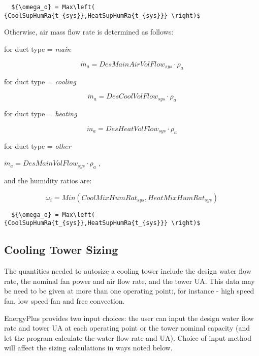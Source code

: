 \begin{lstlisting}
  ${\omega_o} = Max\left( {CoolSupHumRa{t_{sys}},HeatSupHumRa{t_{sys}}} \right)$ 
\end{lstlisting}

Otherwise, air mass flow rate is determined as follows:

for duct type = \emph{main}

\begin{equation}
{\dot m_a} = DesMainAirVolFlo{w_{sys}} \cdot {\rho_a}
\end{equation}

for duct type = \emph{cooling}

\begin{equation}
{\dot m_a} = DesCoolVolFlo{w_{sys}} \cdot {\rho_a}
\end{equation}

for duct type = \emph{heating}

\begin{equation}
{\dot m_a} = DesHeatVolFlo{w_{sys}} \cdot {\rho_a}
\end{equation}

for duct type = \emph{other}

\({\dot m_a} = DesMainVolFlo{w_{sys}} \cdot {\rho_a}\) ,

and the humidity ratios are:

\begin{equation}
{\omega_i} = Min\left( {CoolMixHumRa{t_{sys}},HeatMixHumRa{t_{sys}}} \right)
\end{equation}

\begin{lstlisting}
  ${\omega_o} = Max\left( {CoolSupHumRa{t_{sys}},HeatSupHumRa{t_{sys}}} \right)$ 
\end{lstlisting}

\subsection{Cooling Tower Sizing}\label{cooling-tower-sizing}

The quantities needed to autosize a cooling tower include the design water flow rate, the nominal fan power and air flow rate, and the tower UA. This data may be need to be given at more than one operating point:, for instance - high speed fan, low speed fan and free convection.

EnergyPlus provides two input choices: the user can input the design water flow rate and tower UA at each operating point or the tower nominal capacity (and let the program calculate the water flow rate and UA). Choice of input method will affect the sizing calculations in ways noted below.

